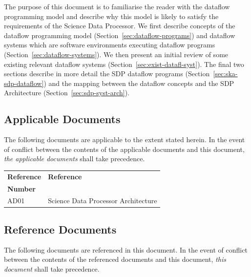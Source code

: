 \documentclass[11pt,a4paper]{article}
\begin{document}
\sdpfrontpage

\sdptableofcontents

\sdplistoffigures

\sdplistoftables

\sdpsummary

The purpose of this document is to familiarise the reader with the
dataflow programming model and describe why this model is likely to
satisfy the requirements of the Science Data Processor.  We first
describe concepts of the dataflow programming model
(Section~\ref{sec:dataflow-programs}) and dataflow systems which are
software environments executing dataflow programs
(Section~\ref{sec:dataflow-systems}). We then present an initial
review of some existing relevant dataflow systems
(Section~\ref{sec:exist-datafl-syst}). The final two sections describe
in more detail the SDP dataflow programs
(Section~\ref{sec:ska-sdp-dataflow}) and the mapping between the
dataflow concepts and the SDP Architecture
(Section~\ref{sec:sdp-syst-arch}).

\sdpreferencedocs

\subsection*{Applicable Documents}

The following documents are applicable to the extent stated herein. In the
event of conflict between the contents of the applicable documents and this
document, \emph{the applicable documents} shall take precedence.

\begin{center}{
\begin{tabularx}{\textwidth}{|X|X|}
    \hline
    \bf{Reference} & \bf{Reference}\\
    \bf{Number} & \\
    \hline
    AD01 & Science Data Processor Architecture\\\hline
\end{tabularx}}
\end{center}

\subsection*{Reference Documents}

The following documents are referenced in this document. In the event of
conflict between the contents of the referenced documents and this document,
\emph{this document} shall take precedence.
\end{document}
